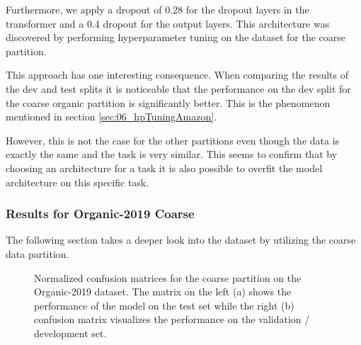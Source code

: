 Furthermore, we apply a dropout of 0.28 for the dropout layers in the transformer and a 0.4 dropout for the output layers. This architecture was discovered by performing hyperparameter tuning on the dataset for the coarse partition.
\bigskip

This approach has one interesting consequence. When comparing the results of the dev and test splits it is noticeable that the performance on the dev split for the coarse organic partition is significantly better. This is the phenomenon mentioned in section \ref{sec:06_hpTuningAmazon}.
\smallskip

However, this is not the case for the other partitions even though the data is exactly the same and the task is very similar. This seems to confirm that by choosing an architecture for a task it is also possible to overfit the model architecture on this specific task.


\subsubsection*{Results for Organic-2019 Coarse}
The following section takes a deeper look into the dataset by utilizing the coarse data partition.


\begin{figure}[htb]
	\centering
	
	\caption{Normalized confusion matrices for the coarse partition on the Organic-2019 dataset. The matrix on the left {(a)} shows the performance of the model on the test set while the right {(b)} confusion matrix visualizes the performance on the validation / development set.}
	\label{fig:06_ORG_coarse_cmatrices}
\end{figure}

